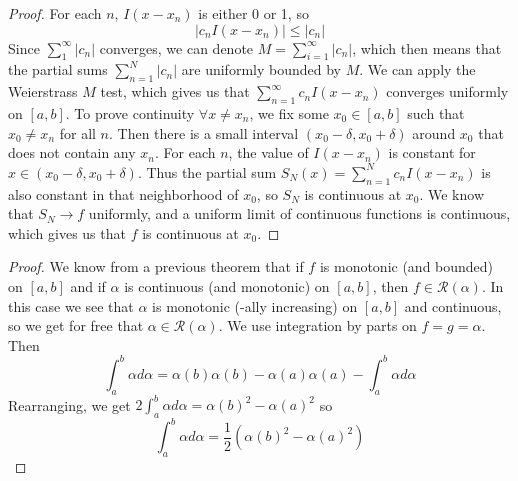 \documentclass[11pt]{article}
\begin{document}
\begin{exercise}{7.8}
    \begin{proof}
        For each $n$, $I(x - x_n)$ is either 0 or 1, so $$|c_nI(x - x_n)| \le |c_n|$$ Since $\sum_1^\infty |c_n|$ converges, we can denote $M = \sum_{i = 1}^\infty |c_n|$, which then means that the partial sums $\sum_{n = 1}^N |c_n|$ are uniformly bounded by $M$. We can apply the Weierstrass $M$ test, which gives us that $\sum_{n = 1}^\infty c_n I(x - x_n)$ converges uniformly on $[a, b]$. To prove continuity $\forall x \neq x_n$, we fix some $x_0 \in [a, b]$ such that $x_0 \neq x_n$ for all $n$. Then there is a small interval $(x_0 - \delta, x_0 + \delta)$ around $x_0$ that does not contain any $x_n$. For each $n$, the value of $I(x - x_n)$ is constant for $x \in (x_0 - \delta, x_0 + \delta)$. Thus the partial sum $S_N(x) = \sum_{n = 1}^N c_n I(x - x_n)$ is also constant in that neighborhood of $x_0$, so $S_N$ is continuous at $x_0$. We know that $S_N \to f$ uniformly, and a uniform limit of continuous functions is continuous, which gives us that $f$ is continuous at $x_0$. 
    \end{proof}
\end{exercise}

\begin{exercise}{1}
    \begin{proof}
        We know from a previous theorem that if $f$ is monotonic (and bounded) on $[a, b]$ and if $\alpha$ is continuous (and monotonic) on $[a, b]$, then $f \in \mathcal{R}(\alpha)$. In this case we see that $\alpha$ is monotonic (-ally increasing) on $[a, b]$ and continuous, so we get for free that $\alpha \in \mathcal{R}(\alpha)$. We use integration by parts on $f = g = \alpha$. Then $$\int_a^b \alpha d \alpha = \alpha(b)\alpha(b) - \alpha(a) \alpha(a) - \int_a^b \alpha d\alpha$$ Rearranging, we get $2 \int_a^b \alpha d\alpha = \alpha(b)^2 - \alpha(a)^2$ so $$\int_a^b \alpha d \alpha = \frac{1}{2} (\alpha(b)^2 - \alpha(a)^2)$$
    \end{proof}
\end{exercise}
\end{document}
